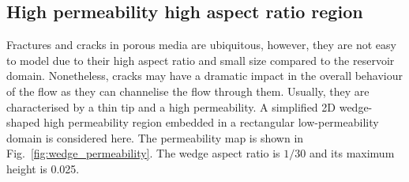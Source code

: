 \documentclass[times]{fldauth}
\begin{document}
\subsection{High permeability high aspect ratio region}\label{res4}

Fractures and cracks in porous media are ubiquitous, however, they are
not easy to model due to their high aspect ratio and small size
compared to the reservoir domain. Nonetheless, cracks may have a
dramatic impact in the overall behaviour of the flow as they can
channelise the flow through them. Usually, they are characterised by a
thin tip and a high permeability. A simplified 2D wedge-shaped
high permeability region embedded in a rectangular low-permeability
domain is considered here. The permeability map is shown in
Fig.~\ref{fig:wedge_permeability}. The wedge aspect ratio is $1/30$
and its maximum height is 0.025.
\end{document}
